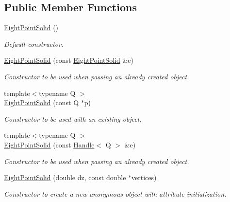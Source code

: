 \subsection*{Public Member Functions}
\begin{DoxyCompactItemize}
\item 
\hyperlink{class_d_d4hep_1_1_geometry_1_1_eight_point_solid_aeedf6b76a2ae0337100dd3fdc3a56237}{EightPointSolid} ()
\begin{DoxyCompactList}\small\item\em Default constructor. \item\end{DoxyCompactList}\item 
\hyperlink{class_d_d4hep_1_1_geometry_1_1_eight_point_solid_a3b22b341fca7889ffa258b4d42cd9ccf}{EightPointSolid} (const \hyperlink{class_d_d4hep_1_1_geometry_1_1_eight_point_solid}{EightPointSolid} \&e)
\begin{DoxyCompactList}\small\item\em Constructor to be used when passing an already created object. \item\end{DoxyCompactList}\item 
{\footnotesize template$<$typename Q $>$ }\\\hyperlink{class_d_d4hep_1_1_geometry_1_1_eight_point_solid_ae29bd978ed1fa63973e48ba9bc9c9642}{EightPointSolid} (const Q $\ast$p)
\begin{DoxyCompactList}\small\item\em Constructor to be used with an existing object. \item\end{DoxyCompactList}\item 
{\footnotesize template$<$typename Q $>$ }\\\hyperlink{class_d_d4hep_1_1_geometry_1_1_eight_point_solid_afa7511ee7f381557c3508188154327d7}{EightPointSolid} (const \hyperlink{class_d_d4hep_1_1_handle}{Handle}$<$ Q $>$ \&e)
\begin{DoxyCompactList}\small\item\em Constructor to be used when passing an already created object. \item\end{DoxyCompactList}\item 
\hyperlink{class_d_d4hep_1_1_geometry_1_1_eight_point_solid_a31cadc86111d6b1cfcd6767c33c64f73}{EightPointSolid} (double dz, const double $\ast$vertices)
\begin{DoxyCompactList}\small\item\em Constructor to create a new anonymous object with attribute initialization. \item\end{DoxyCompactList}\item 

\end{DoxyCompactItemize}

